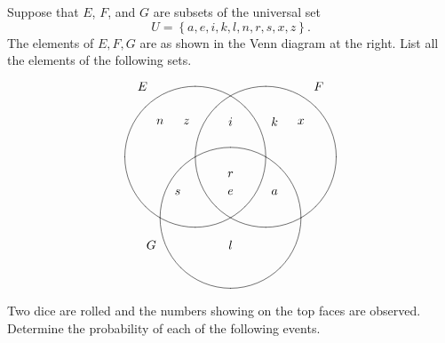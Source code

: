 \documentclass[addpoints,12pt]{exam}
\begin{document}
\begin{questions}

\begin{multicols}{2}
\question[12]
Suppose that $E$, $F$, and $G$ are subsets
of the universal set
\[U=\left\{a,e,i,k,l,n,r,s,x,z\right\}.\]
The elements of
$E,F,G$ are as shown in the Venn diagram
at the right.
List all the elements of the following sets.
\[\begin{xy}<1cm,0cm>:
(-2.5,2)*{E};
(2.5,2)*{F};
(-2.25,-2.5)*{G};
(-1,0)*\cir<2cm>{};
(1,0)*\cir<2cm>{};
(0,-1.732)*\cir<2cm>{};
(-2,1)*{n};
(-1.25,1)*{z};
(-1.5,-1)*{s};
(0,1)*{i};
(0,-.5)*{r};
(0,-1)*{e};
(1.25,1)*{k};
(1.25,-1)*{a};
(2,1)*{x};
(0,-2.5)*{l};
\end{xy}\]
\end{multicols}
\ifprintanswers\else\newpage\fi

\question[24] Two dice are rolled and the
numbers showing on the top faces are observed.
Determine the probability of each of the following events.
\end{questions}
\end{document}
